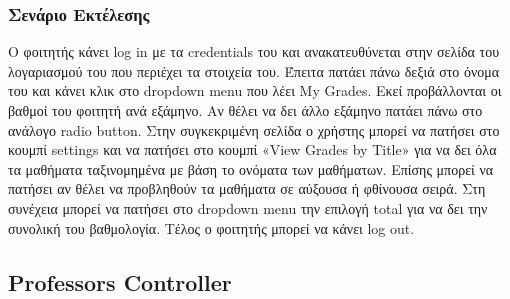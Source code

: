 \documentclass[12pt]{article}
\begin{document}
	\subsubsection{Σενάριο Εκτέλεσης}
	Ο φοιτητής κάνει log in με τα credentials του και ανακατευθύνεται στην σελίδα του λογαριασμού του που περιέχει τα στοιχεία του. Έπειτα πατάει πάνω δεξιά στο όνομα του και κάνει κλικ στο  dropdown menu που λέει My Grades. Εκεί προβάλλονται οι βαθμοί του φοιτητή ανά εξάμηνο.  Αν θέλει να δει άλλο εξάμηνο πατάει πάνω στο ανάλογο radio button. Στην συγκεκριμένη σελίδα ο χρήστης μπορεί να πατήσει στο κουμπί settings και να πατήσει στο κουμπί «View Grades by Title» για να δει όλα τα μαθήματα ταξινομημένα με βάση το ονόματα των μαθήματων. Επίσης μπορεί να πατήσει αν θέλει να προβληθούν τα μαθήματα σε αύξουσα ή φθίνουσα σειρά. Στη συνέχεια μπορεί να πατήσει στο dropdown menu την επιλογή total για να δει την συνολική του βαθμολογία. Τέλος ο φοιτητής μπορεί να κάνει log out.
	
	\subsection{Professors Controller}
	
\end{document}

